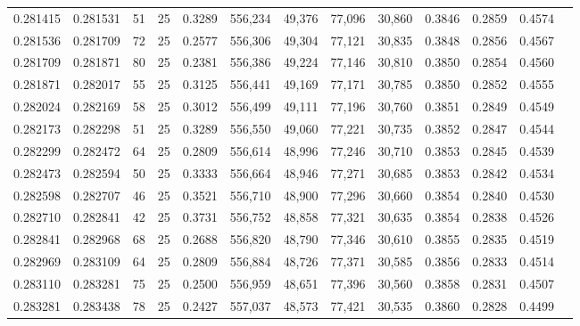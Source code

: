 \begin{tabular}{rrrrrrrrrrrrr}
0.281415 & 0.281531 &    51 &  25 &                                     0.3289 & 556,234 &  49,376 &  77,096 &  30,860 & 0.3846 & 0.2859 & 0.4574 \\
0.281536 & 0.281709 &    72 &  25 &                                     0.2577 & 556,306 &  49,304 &  77,121 &  30,835 & 0.3848 & 0.2856 & 0.4567 \\
0.281709 & 0.281871 &    80 &  25 &                                     0.2381 & 556,386 &  49,224 &  77,146 &  30,810 & 0.3850 & 0.2854 & 0.4560 \\
0.281871 & 0.282017 &    55 &  25 &                                     0.3125 & 556,441 &  49,169 &  77,171 &  30,785 & 0.3850 & 0.2852 & 0.4555 \\
0.282024 & 0.282169 &    58 &  25 &                                     0.3012 & 556,499 &  49,111 &  77,196 &  30,760 & 0.3851 & 0.2849 & 0.4549 \\
0.282173 & 0.282298 &    51 &  25 &                                     0.3289 & 556,550 &  49,060 &  77,221 &  30,735 & 0.3852 & 0.2847 & 0.4544 \\
0.282299 & 0.282472 &    64 &  25 &                                     0.2809 & 556,614 &  48,996 &  77,246 &  30,710 & 0.3853 & 0.2845 & 0.4539 \\
0.282473 & 0.282594 &    50 &  25 &                                     0.3333 & 556,664 &  48,946 &  77,271 &  30,685 & 0.3853 & 0.2842 & 0.4534 \\
0.282598 & 0.282707 &    46 &  25 &                                     0.3521 & 556,710 &  48,900 &  77,296 &  30,660 & 0.3854 & 0.2840 & 0.4530 \\
0.282710 & 0.282841 &    42 &  25 &                                     0.3731 & 556,752 &  48,858 &  77,321 &  30,635 & 0.3854 & 0.2838 & 0.4526 \\
0.282841 & 0.282968 &    68 &  25 &                                     0.2688 & 556,820 &  48,790 &  77,346 &  30,610 & 0.3855 & 0.2835 & 0.4519 \\
0.282969 & 0.283109 &    64 &  25 &                                     0.2809 & 556,884 &  48,726 &  77,371 &  30,585 & 0.3856 & 0.2833 & 0.4514 \\
0.283110 & 0.283281 &    75 &  25 &                                     0.2500 & 556,959 &  48,651 &  77,396 &  30,560 & 0.3858 & 0.2831 & 0.4507 \\
0.283281 & 0.283438 &    78 &  25 &                                     0.2427 & 557,037 &  48,573 &  77,421 &  30,535 & 0.3860 & 0.2828 & 0.4499 \\

\end{tabular}
